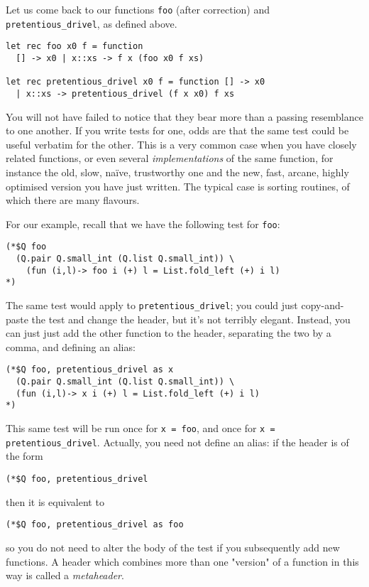 
Let us come back to our functions \texttt{foo} (after correction) and \texttt{pretentious\_drivel}, as
defined above.


\begin{verbatim}
let rec foo x0 f = function
  [] -> x0 | x::xs -> f x (foo x0 f xs)

let rec pretentious_drivel x0 f = function [] -> x0
  | x::xs -> pretentious_drivel (f x x0) f xs
\end{verbatim}

You will not have failed to notice that they bear more than a passing resemblance to one
another. If you write tests for one, odds are that the same test could be useful verbatim
for the other. This is a very common case when you have closely related functions, or even
several \emph{implementations} of the same function, for instance the old, slow, naïve,
trustworthy one and the new, fast, arcane, highly optimised version you have just written.
The typical case is sorting routines, of which there are many flavours.

For our example, recall that we have the following test for \texttt{foo}:

\begin{verbatim}
(*$Q foo
  (Q.pair Q.small_int (Q.list Q.small_int)) \
    (fun (i,l)-> foo i (+) l = List.fold_left (+) i l)
*)
\end{verbatim}

The same test would apply to \texttt{pretentious\_drivel}; you could just copy-and-paste the test
and change the header, but it's not terribly elegant. Instead, you can just just add the
other function to the header, separating the two by a comma, and defining an alias:

\begin{verbatim}
(*$Q foo, pretentious_drivel as x
  (Q.pair Q.small_int (Q.list Q.small_int)) \
  (fun (i,l)-> x i (+) l = List.fold_left (+) i l)
*)
\end{verbatim}

This same test will be run once for \texttt{x = foo}, and once for \texttt{x = pretentious\_drivel}.
Actually, you need not define an alias: if the header is of the form

\begin{verbatim}
(*$Q foo, pretentious_drivel
\end{verbatim}

then it is equivalent to

\begin{verbatim}
(*$Q foo, pretentious_drivel as foo
\end{verbatim}

so you do not need to alter the body of the test if you subsequently add new functions. A
header which combines more than one "version" of a function in this way is called a
\emph{metaheader}.